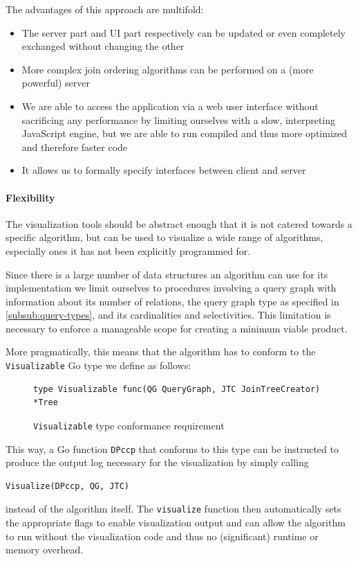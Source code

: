 The advantages of this approach are multifold:
\begin{itemize}
    \item The server part and UI part respectively can be
          updated or even completely exchanged without 
          changing the other
    \item More complex join ordering algorithms can be 
          performed on a (more powerful) server
    \item We are able to access the application 
          via a web user interface without sacrificing 
          any performance by limiting ourselves with a 
          slow, interpreting JavaScript engine, but we are  
          able to run compiled and thus more optimized and therefore faster code
    \item It allows us to formally specify interfaces between
          client and server %
\end{itemize}

\paragraph{Flexibility}
The visualization tools should be abstract enough that it is not catered towards a specific algorithm, but can be used to visualize a wide range of algorithms, especially ones it has not been explicitly programmed for.  

Since there is a large number of data structures an algorithm can use for its implementation we limit ourselves to procedures involving a query graph with information about its number of relations, the query graph type as specified in \ref{subsub:query-types}, and its cardinalities and selectivities.
This limitation is necessary to enforce a manageable scope for creating a minimum viable product.

More pragmatically, this means that the algorithm has to 
conform to the \texttt{Visualizable} Go type we define as 
follows:

\begin{figure}[H]
    \begin{verbatim}
type Visualizable func(QG QueryGraph, JTC JoinTreeCreator) *Tree
    \end{verbatim}
    \caption{\texttt{Visualizable} type conformance requirement}
    \centering
\label{fig:visalizable}
\end{figure}

\begin{example}
This way, a Go function \texttt{DPccp} that conforms to this type can be instructed to produce the output  log necessary for the visualization by simply calling 

\begin{verbatim}
Visualize(DPccp, QG, JTC)
\end{verbatim}
instead of the algorithm itself. The \texttt{visualize} function then automatically sets the appropriate flags to enable visualization output and can allow the algorithm to run without the visualization code and thus no (significant) runtime or memory overhead.

\end{example}

